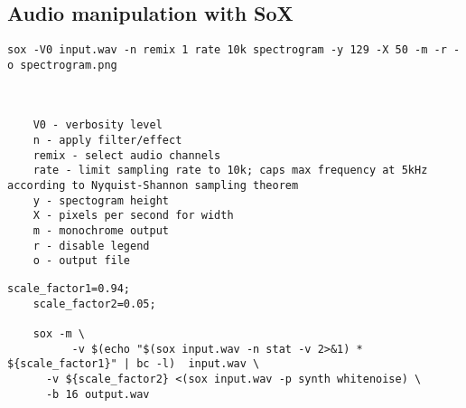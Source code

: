 \begin{appendices}
\section{Audio manipulation with SoX}

    \begin{lstlisting}[caption=Generating monochrome spectrograms with SoX]
    sox -V0 input.wav -n remix 1 rate 10k spectrogram -y 129 -X 50 -m -r -o spectrogram.png
    
    
    
    V0 - verbosity level 
    n - apply filter/effect
    remix - select audio channels
    rate - limit sampling rate to 10k; caps max frequency at 5kHz according to Nyquist-Shannon sampling theorem
    y - spectogram height
    X - pixels per second for width
    m - monochrome output
    r - disable legend
    o - output file
    \end{lstlisting}
    
    \begin{lstlisting}[caption=Adding white noise to an audio file]
    scale_factor1=0.94; 
    scale_factor2=0.05;
     
    sox -m \
          -v $(echo "$(sox input.wav -n stat -v 2>&1) * ${scale_factor1}" | bc -l)  input.wav \
      -v ${scale_factor2} <(sox input.wav -p synth whitenoise) \
      -b 16 output.wav
   \end{lstlisting}

\end{appendices}